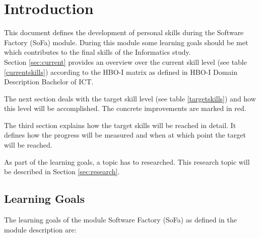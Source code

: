 \section{Introduction}
\label{sec:intro}


This document defines the development of personal skills during the Software Factory (SoFa) module.
During this module some learning goals should be met which contributes to the final skills of the Informatics study.
~\\
Section \ref{sec:current} provides an overview over the current skill level (see table \ref{currentskills}) according to the HBO-I matrix as defined in \glqq HBO-I Domain Description Bachelor of ICT\grqq.

The next section deals with the target skill level (see table \ref{targetskills}) and how this level will be accomplished. The concrete improvements are marked in red.

The third section explains how the target skills will be reached in detail. It defines how the progress will be measured and when at which point the target will be reached.

As part of the learning goals, a topic has to researched. This research topic will be described in Section \ref{sec:research}.



\subsection{Learning Goals}
\label{ssec:learning}
The learning goals of the module Software Factory (SoFa) as defined in the module description are:

